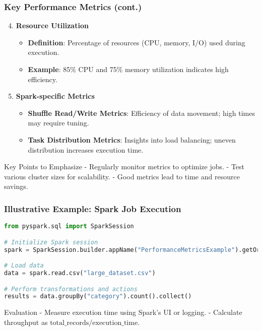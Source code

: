 \documentclass[aspectratio=169]{beamer}
\begin{document}
\begin{frame}[fragile]
  \frametitle{Key Performance Metrics (cont.)}
  \begin{enumerate}
    \setcounter{enumi}{3}
    \item \textbf{Resource Utilization}
      \begin{itemize}
        \item \textbf{Definition}: Percentage of resources (CPU, memory, I/O) used during execution.
        \item \textbf{Example}: 85\% CPU and 75\% memory utilization indicates high efficiency.
      \end{itemize}

    \item \textbf{Spark-specific Metrics}
      \begin{itemize}
        \item \textbf{Shuffle Read/Write Metrics}: Efficiency of data movement; high times may require tuning.
        \item \textbf{Task Distribution Metrics}: Insights into load balancing; uneven distribution increases execution time.
      \end{itemize}
  \end{enumerate}
  \begin{block}{Key Points to Emphasize}
    - Regularly monitor metrics to optimize jobs.
    - Test various cluster sizes for scalability.
    - Good metrics lead to time and resource savings.
  \end{block}
\end{frame}

\begin{frame}[fragile]
  \frametitle{Illustrative Example: Spark Job Execution}
  \begin{lstlisting}[language=Python]
from pyspark.sql import SparkSession

# Initialize Spark session
spark = SparkSession.builder.appName("PerformanceMetricsExample").getOrCreate()

# Load data
data = spark.read.csv("large_dataset.csv")

# Perform transformations and actions
results = data.groupBy("category").count().collect()
  \end{lstlisting}
  \begin{block}{Evaluation}
    - Measure execution time using Spark's UI or logging.
    - Calculate throughput as $\text{total\_records} / \text{execution\_time}$.
  \end{block}
\end{frame}
\end{document}
